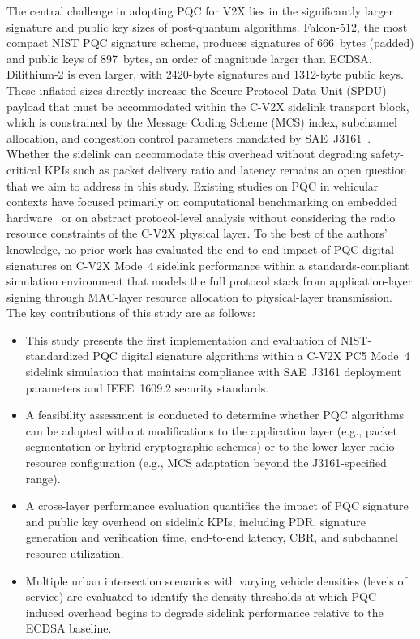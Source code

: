 \documentclass[letterpaper,journal]{IEEEtran}
\begin{document}
The central challenge in adopting PQC for V2X lies in the significantly larger signature and public key sizes of post-quantum algorithms. Falcon-512, the most compact NIST PQC signature scheme, produces signatures of 666~bytes (padded) and public keys of 897~bytes, an order of magnitude larger than ECDSA. Dilithium-2 is even larger, with 2420-byte signatures and 1312-byte public keys. These inflated sizes directly increase the Secure Protocol Data Unit (SPDU) payload that must be accommodated within the C-V2X sidelink transport block, which is constrained by the Message Coding Scheme (MCS) index, subchannel allocation, and congestion control parameters mandated by SAE~J3161~\cite{mamun2026post}. Whether the sidelink can accommodate this overhead without degrading safety-critical KPIs such as packet delivery ratio and latency remains an open question that we aim to address in this study.
\IEEEpubidadjcol
Existing studies on PQC in vehicular contexts have focused primarily on computational benchmarking on embedded hardware~\cite{kumar2024pqc_automotive} or on abstract protocol-level analysis without considering the radio resource constraints of the C-V2X physical layer. To the best of the authors' knowledge, no prior work has evaluated the end-to-end impact of PQC digital signatures on C-V2X Mode~4 sidelink performance within a standards-compliant simulation environment that models the full protocol stack from application-layer signing through MAC-layer resource allocation to physical-layer transmission. The key contributions of this study are as follows:
\begin{itemize}
    \item This study presents the first implementation and evaluation of NIST-standardized PQC digital signature algorithms within a C-V2X PC5 Mode~4 sidelink simulation that maintains compliance with SAE~J3161 deployment parameters and IEEE~1609.2 security standards.
    \item A feasibility assessment is conducted to determine whether PQC algorithms can be adopted without modifications to the application layer (e.g., packet segmentation or hybrid cryptographic schemes) or to the lower-layer radio resource configuration (e.g., MCS adaptation beyond the J3161-specified range).
    \item A cross-layer performance evaluation quantifies the impact of PQC signature and public key overhead on sidelink KPIs, including PDR, signature generation and verification time, end-to-end latency, CBR, and subchannel resource utilization.
    \item Multiple urban intersection scenarios with varying vehicle densities (levels of service) are evaluated to identify the density thresholds at which PQC-induced overhead begins to degrade sidelink performance relative to the ECDSA baseline.
\end{itemize}
\end{document}
